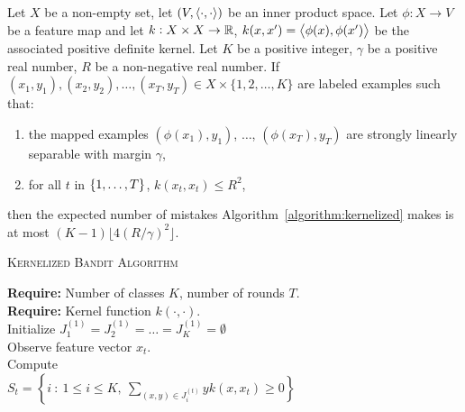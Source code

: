\begin{theorem}
\label{theorem:kernelized-upper-bound}
Let $X$ be a non-empty set, let $(V, \left\langle \cdot, \cdot \right\rangle)$ be an inner product
space. Let $\phi:X \to V$ be a feature map and let $k:X \times X \to \mathbb{R}$,
$k(x,x') = \left\langle \phi(x), \phi(x') \right\rangle$ be the associated positive definite
kernel. Let $K$ be a positive integer, $\gamma$ be a positive real number, $R$
be a non-negative real number. If $(x_1, y_1), (x_2, y_2), \dots, (x_T, y_T) \in
X \times \{1,2,\dots,K\}$ are labeled examples such that:
\begin{enumerate}
\item the mapped examples $(\phi(x_1), y_1)$, $\dots$, $(\phi(x_T), y_T)$
are strongly linearly separable with margin $\gamma$,
\item for all $t$ in $\cbr{1,\ldots,T}$, $k(x_t,x_t) \le R^2$,
\end{enumerate}
then the expected number of mistakes Algorithm~\ref{algorithm:kernelized} makes
is at most $(K-1) \lfloor 4(R/\gamma)^2 \rfloor$.
\end{theorem}

\begin{algorithm}[h]
\caption{\textsc{Kernelized Bandit Algorithm}
\label{algorithm:kernelized}}
\textbf{Require:} Number of classes $K$, number of rounds $T$.\\
\textbf{Require:} Kernel function  $k(\cdot, \cdot)$. \\
Initialize $J_1^{(1)} = J_2^{(1)} = \dots = J_K^{(1)} = \emptyset$ \\
 {
     Observe feature vector $x_t$.\\
     Compute \\ $S_t = \left\{ i ~:~ 1 \le i \le K, \ \sum_{(x,y) \in J_i^{(t)}} y k(x, x_t) \ge 0 \right\}$ \\
}

\end{algorithm}
